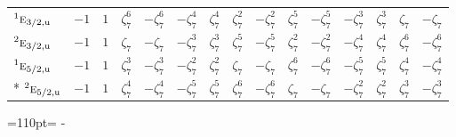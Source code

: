 \documentclass[10pt,a4paper]{article}
\newcommand{\needspace}[1]{\par\penalty-100\begingroup\dimen0=#1\relax\dimen2=\pagegoal
  \advance\dimen2-\pagetotal\ifdim\dimen0>\dimen2\relax\ifdim\dimen2>0pt\vfil\break\fi\fi
  \endgroup}
\numberwithin{equation}{section}
\newcommand{\irr}[1]{\text{\normalfont\scshape #1}}
\newcommand{\conjpair}[1]{{}^{#1}}
\newcommand{\ptag}[1]{\mathrm{#1}}
\newcommand{\rootunity}[1]{\zeta_{#1}}
\begin{document}
{\begin{longtable}{@{}lcccccccccccccc@{}}
$\conjpair{1}\irr{e}_{3/2,\ptag{u}}$ & $-1$ & $1$ & $\rootunity{7}^{6}$ & $-\rootunity{7}^{6}$ & $-\rootunity{7}^{4}$ & $\rootunity{7}^{4}$ & $\rootunity{7}^{2}$ & $-\rootunity{7}^{2}$ & $\rootunity{7}^{5}$ & $-\rootunity{7}^{5}$ & $-\rootunity{7}^{3}$ & $\rootunity{7}^{3}$ & $\rootunity{7}$ & $-\rootunity{7}$\\
$\conjpair{2}\irr{e}_{3/2,\ptag{u}}$ & $-1$ & $1$ & $\rootunity{7}$ & $-\rootunity{7}$ & $-\rootunity{7}^{3}$ & $\rootunity{7}^{3}$ & $\rootunity{7}^{5}$ & $-\rootunity{7}^{5}$ & $\rootunity{7}^{2}$ & $-\rootunity{7}^{2}$ & $-\rootunity{7}^{4}$ & $\rootunity{7}^{4}$ & $\rootunity{7}^{6}$ & $-\rootunity{7}^{6}$\\
$\conjpair{1}\irr{e}_{5/2,\ptag{u}}$ & $-1$ & $1$ & $\rootunity{7}^{3}$ & $-\rootunity{7}^{3}$ & $-\rootunity{7}^{2}$ & $\rootunity{7}^{2}$ & $\rootunity{7}$ & $-\rootunity{7}$ & $\rootunity{7}^{6}$ & $-\rootunity{7}^{6}$ & $-\rootunity{7}^{5}$ & $\rootunity{7}^{5}$ & $\rootunity{7}^{4}$ & $-\rootunity{7}^{4}$\\*
$\conjpair{2}\irr{e}_{5/2,\ptag{u}}$ & $-1$ & $1$ & $\rootunity{7}^{4}$ & $-\rootunity{7}^{4}$ & $-\rootunity{7}^{5}$ & $\rootunity{7}^{5}$ & $\rootunity{7}^{6}$ & $-\rootunity{7}^{6}$ & $\rootunity{7}$ & $-\rootunity{7}$ & $-\rootunity{7}^{2}$ & $\rootunity{7}^{2}$ & $\rootunity{7}^{3}$ & $-\rootunity{7}^{3}$\\
\bottomrule\end{longtable}}
\needspace{110pt}
\end{document}
